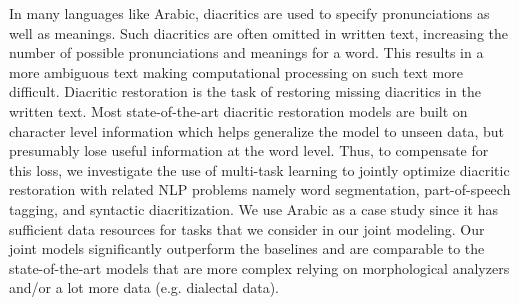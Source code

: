 In many languages like Arabic, diacritics are used to specify pronunciations as well as meanings. Such diacritics are often omitted in written text, increasing the number of possible pronunciations and meanings for a word. This results in a more ambiguous text making computational  processing on such text more difficult. Diacritic restoration is the task of restoring missing diacritics in the written text. Most state-of-the-art diacritic restoration models are built on character level information which helps generalize the model to unseen data, but presumably lose  useful information at the word level.  Thus, to compensate for this loss, we investigate the use of multi-task learning to jointly optimize diacritic restoration with related NLP problems namely word segmentation, part-of-speech tagging, and syntactic  diacritization. We  use  Arabic  as  a  case study since it has sufficient data  resources  for  tasks  that  we  consider  in our joint modeling. Our joint models significantly  outperform the baselines and are comparable to the state-of-the-art models that are more complex relying on morphological analyzers and/or a lot more data (e.g. dialectal data).
